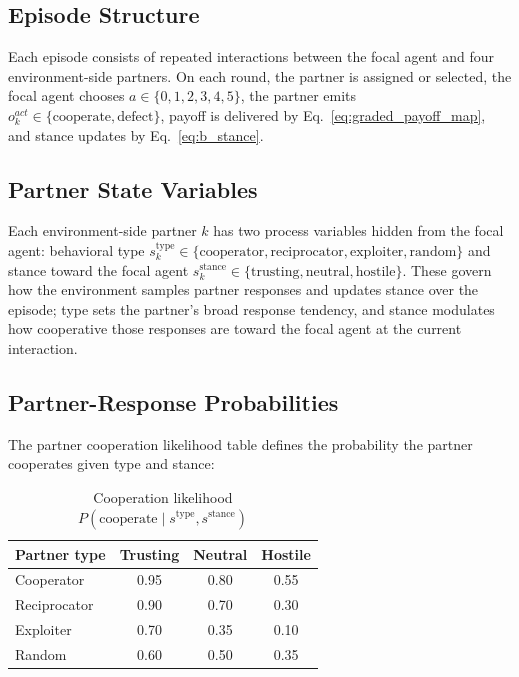 \documentclass[runningheads,orivec]{llncs}
\begin{document}
\subsection{Episode Structure}

Each episode consists of repeated interactions between the focal agent and four environment-side partners. On each round, the partner is assigned or selected, the focal agent chooses \(a\in\{0,1,2,3,4,5\}\), the partner emits \(o^{act}_k\in\{\mathrm{cooperate},\mathrm{defect}\}\), payoff is delivered by Eq.~\eqref{eq:graded_payoff_map}, and stance updates by Eq.~\eqref{eq:b_stance}.

\subsection{Partner State Variables}

Each environment-side partner \(k\) has two process variables hidden from the focal agent: behavioral type \(s^{\mathrm{type}}_k \in \{\mathrm{cooperator},\mathrm{reciprocator},\mathrm{exploiter},\mathrm{random}\}\) and stance toward the focal agent \(s^{\mathrm{stance}}_k \in \{\mathrm{trusting},\mathrm{neutral},\mathrm{hostile}\}\). These govern how the environment samples partner responses and updates stance over the episode; type sets the partner's broad response tendency, and stance modulates how cooperative those responses are toward the focal agent at the current interaction.

\subsection{Partner-Response Probabilities}
\label{app:process_response}

The partner cooperation likelihood table defines the probability the partner cooperates given type and stance:

\begin{table}[H]
\centering
\caption{Cooperation likelihood $P(\text{cooperate} \mid s^{\text{type}}, s^{\text{stance}})$}
\label{tab:coop_likelihood}
\setlength{\tabcolsep}{4pt}
\begin{tabular}{lccc}
\toprule
Partner type & Trusting & Neutral & Hostile \\
\midrule
Cooperator & 0.95 & 0.80 & 0.55 \\
Reciprocator & 0.90 & 0.70 & 0.30 \\
Exploiter & 0.70 & 0.35 & 0.10 \\
Random & 0.60 & 0.50 & 0.35 \\
\bottomrule
\end{tabular}
\end{table}
\end{document}
